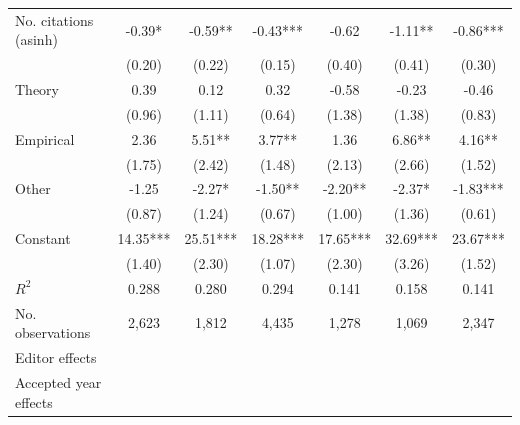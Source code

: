\begin{table}
\begin{threeparttable}
\begin{tabular}{p{3.78cm}S@{}S@{}S@{}S@{}S@{}S@{}}
            No. citations (asinh)         &       -0.39*  &       -0.59** &       -0.43***&       -0.62   &       -1.11** &       -0.86***\\
                                          &      (0.20)   &      (0.22)   &      (0.15)   &      (0.40)   &      (0.41)   &      (0.30)   \\
            Theory                        &        0.39   &        0.12   &        0.32   &       -0.58   &       -0.23   &       -0.46   \\
                                          &      (0.96)   &      (1.11)   &      (0.64)   &      (1.38)   &      (1.38)   &      (0.83)   \\
            Empirical                     &        2.36   &        5.51** &        3.77** &        1.36   &        6.86** &        4.16** \\
                                          &      (1.75)   &      (2.42)   &      (1.48)   &      (2.13)   &      (2.66)   &      (1.52)   \\
            Other                         &       -1.25   &       -2.27*  &       -1.50** &       -2.20** &       -2.37*  &       -1.83***\\
                                          &      (0.87)   &      (1.24)   &      (0.67)   &      (1.00)   &      (1.36)   &      (0.61)   \\
            Constant                      &       14.35***&       25.51***&       18.28***&       17.65***&       32.69***&       23.67***\\
                                          &      (1.40)   &      (2.30)   &      (1.07)   &      (2.30)   &      (3.26)   &      (1.52)   \\
            \midrule
            \(R^2\)                       &       0.288   &       0.280   &       0.294   &       0.141   &       0.158   &       0.141   \\
            No. observations              &       2,623   &       1,812   &       4,435   &       1,278   &       1,069   &       2,347   \\
            \midrule
            Editor effects        &           {}   &           {}   &           {}   &           {}   &           {}   &           {}   \\
            Accepted year effects         &           {}   &           {}   &               &           {}   &           {}   &               \\

\end{tabular}
\end{threeparttable}
\end{table}
